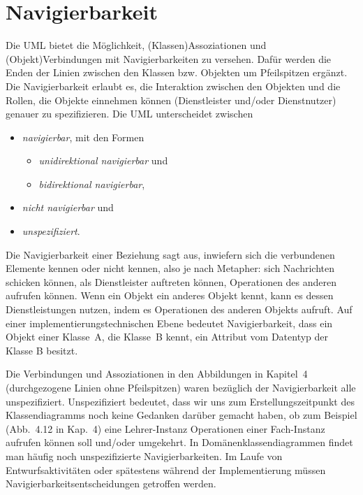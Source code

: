 \section{Navigierbarkeit}
\label{sec:Kap-8.4}

Die UML bietet die Möglichkeit, (Klassen)Assoziationen und (Objekt)Verbindungen mit Navigierbarkeiten zu versehen. Dafür werden die Enden der Linien zwischen den Klassen bzw. Objekten um Pfeilspitzen ergänzt. Die Navigierbarkeit erlaubt es, die Interaktion zwischen den Objekten und die Rollen, die Objekte einnehmen können (Dienstleister und/oder Dienstnutzer) genauer zu spezifizieren. Die UML unterscheidet zwischen
\begin{itemize}
	\item \textit{navigierbar}, mit den Formen
	\begin{itemize}
		\item \textit{unidirektional navigierbar} und 
		\item \textit{bidirektional navigierbar}, 
	\end{itemize}
	\item \textit{nicht navigierbar} und
	\item \textit{unspezifiziert}.
\end{itemize}

Die Navigierbarkeit einer Beziehung sagt aus, inwiefern sich die verbundenen Elemente kennen oder nicht kennen, also je nach Metapher: sich Nachrichten schicken können, als Dienstleister auftreten können, Operationen des anderen aufrufen können. Wenn ein Objekt ein anderes Objekt kennt, kann es dessen Dienstleistungen nutzen, indem es Operationen des anderen Objekts aufruft. Auf einer implemen\-tierungs\-technischen Ebene bedeutet Navigierbarkeit, dass ein Objekt einer Klasse~A, die Klasse~B kennt, ein Attribut vom Datentyp der Klasse B besitzt. 

Die Verbindungen und Assoziationen in den Abbildungen in Kapitel~4
(durchgezogene Linien ohne Pfeilspitzen) waren bezüglich der Navigierbarkeit alle unspezifiziert. Unspezifiziert bedeutet, dass wir uns zum Erstellungszeitpunkt des Klassen\-diagramms noch keine Gedanken darüber gemacht haben, ob zum Beispiel (Abb.~4.12 in Kap.~4) %
eine Lehrer-Instanz Operationen einer Fach-Instanz aufrufen können soll und/oder umgekehrt. In Domänenklassendiagrammen findet man häufig noch unspezifizierte Navigierbarkeiten. Im Laufe von Entwurfsaktivitäten oder spätestens während der Implementierung müssen Navigierbarkeitsentscheidungen getroffen werden. 

